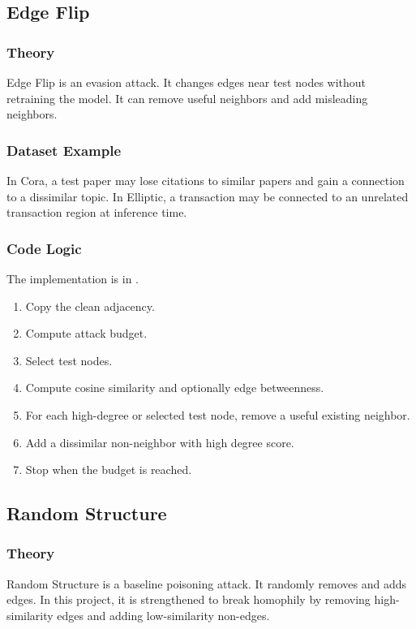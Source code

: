 \documentclass[12pt,a4paper]{article}
\begin{document}
\subsection{Edge Flip}
\subsubsection{Theory}
Edge Flip is an evasion attack. It changes edges near test nodes without retraining the model. It can remove useful neighbors and add misleading neighbors.

\subsubsection{Dataset Example}
In Cora, a test paper may lose citations to similar papers and gain a connection to a dissimilar topic. In Elliptic, a transaction may be connected to an unrelated transaction region at inference time.

\subsubsection{Code Logic}
The implementation is in .

\begin{enumerate}
    \item Copy the clean adjacency.
    \item Compute attack budget.
    \item Select test nodes.
    \item Compute cosine similarity and optionally edge betweenness.
    \item For each high-degree or selected test node, remove a useful existing neighbor.
    \item Add a dissimilar non-neighbor with high degree score.
    \item Stop when the budget is reached.
\end{enumerate}

\subsection{Random Structure}
\subsubsection{Theory}
Random Structure is a baseline poisoning attack. It randomly removes and adds edges. In this project, it is strengthened to break homophily by removing high-similarity edges and adding low-similarity non-edges.
\end{document}
